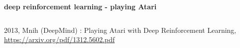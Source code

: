 \documentclass{beamer}
\begin{document}
\begin{frame}{\bf deep reinforcement learning - playing Atari}
\begin{columns}
    \begin{column}{0.5\textwidth}
    \end{column}

  \end{columns}

  2013, Mnih (DeepMind) : Playing Atari with Deep Reinforcement Learning, 
  \url{https://arxiv.org/pdf/1312.5602.pdf}
\end{frame}
\end{document}
